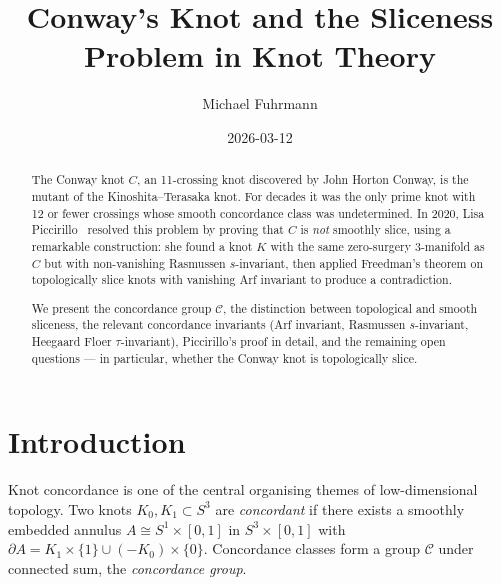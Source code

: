 \documentclass[12pt,a4paper]{amsart}
\theoremstyle{definition}
\theoremstyle{remark}
\begin{document}
\begin{abstract}
The Conway knot $C$, an 11-crossing knot discovered by John Horton Conway,
is the mutant of the Kinoshita--Terasaka knot. For decades it was the only
prime knot with 12 or fewer crossings whose smooth concordance class was
undetermined. In 2020, Lisa Piccirillo~\cite{Piccirillo2020} resolved this
problem by proving that $C$ is \emph{not} smoothly slice, using a remarkable
construction: she found a knot $K$ with the same zero-surgery $3$-manifold
as $C$ but with non-vanishing Rasmussen $s$-invariant, then applied Freedman's
theorem on topologically slice knots with vanishing Arf invariant to produce
a contradiction.

We present the concordance group $\mathcal{C}$, the distinction between
topological and smooth sliceness, the relevant concordance invariants
(Arf invariant, Rasmussen $s$-invariant, Heegaard Floer $\tau$-invariant),
Piccirillo's proof in detail, and the remaining open questions — in particular,
whether the Conway knot is topologically slice.
\end{abstract}

\title{Conway's Knot and the Sliceness Problem in Knot Theory}
\author{Michael Fuhrmann}
\address{Specialist Mathematics Project, Build 165}
\date{2026-03-12}

\maketitle

\section{Introduction}

Knot concordance is one of the central organising themes of low-dimensional
topology. Two knots $K_0, K_1 \subset S^3$ are \emph{concordant} if there
exists a smoothly embedded annulus $A \cong S^1 \times [0,1]$ in
$S^3 \times [0,1]$ with $\partial A = K_1 \times \{1\} \cup (-K_0) \times \{0\}$.
Concordance classes form a group $\mathcal{C}$ under connected sum, the
\emph{concordance group}.
\end{document}
